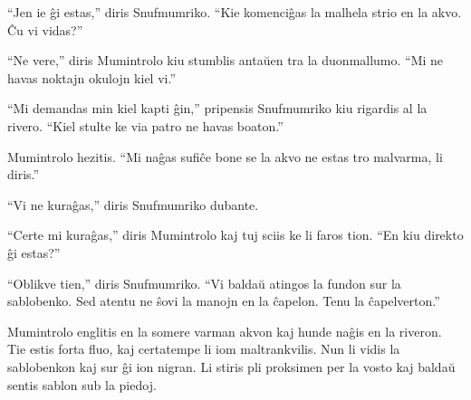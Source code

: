``Jen ie ĝi estas,'' diris Snufmumriko. ``Kie komenciĝas la malhela strio en la akvo. Ĉu vi vidas?''

``Ne vere,'' diris Mumintrolo kiu stumblis antaŭen tra la duonmallumo. ``Mi ne havas noktajn okulojn kiel vi.''

``Mi demandas min kiel kapti ĝin,'' pripensis Snufmumriko kiu rigardis al la rivero. ``Kiel stulte ke via patro ne havas boaton.''

Mumintrolo hezitis. ``Mi naĝas sufiĉe bone se la akvo ne estas tro malvarma, li diris.''

``Vi ne kuraĝas,'' diris Snufmumriko dubante.

``Certe mi kuraĝas,'' diris Mumintrolo kaj tuj sciis ke li faros tion. ``En kiu direkto ĝi estas?''

``Oblikve tien,'' diris Snufmumriko. ``Vi baldaŭ atingos la fundon sur la sablobenko. Sed atentu ne ŝovi la manojn en la ĉapelon. Tenu la ĉapelverton.''

Mumintrolo englitis en la somere varman akvon kaj hunde naĝis en la riveron. Tie estis forta fluo, kaj certatempe li iom maltrankvilis. Nun li vidis la sablobenkon kaj sur ĝi ion nigran. Li stiris pli proksimen per la vosto kaj baldaŭ sentis sablon sub la piedoj.

